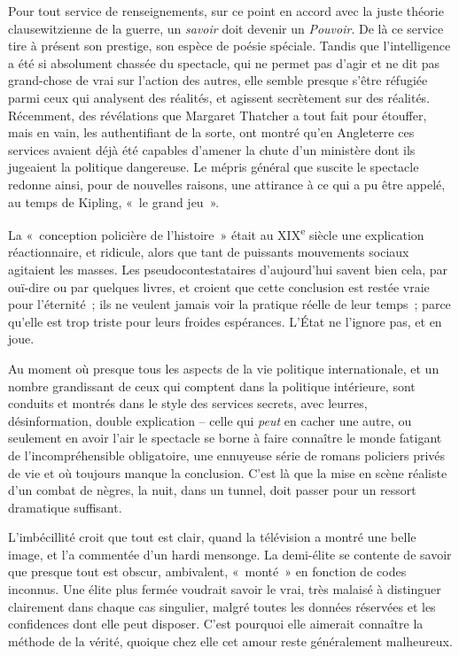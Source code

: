 \documentclass[french,twoside]{book} %
\begin{document}
\noindent Pour tout service de renseignements, sur ce point en accord avec la juste théorie clausewitzienne de la guerre, un \emph{savoir} doit devenir un \emph{Pouvoir}. De là ce service tire à présent son prestige, son espèce de poésie spéciale. Tandis que l’intelligence a été si absolument chassée du spectacle, qui ne permet pas d’agir et ne dit pas grand-chose de vrai sur l’action des autres, elle semble presque s’être réfugiée parmi ceux qui analysent des réalités, et agissent secrètement sur des réalités. Récemment, des révélations que Margaret Thatcher a tout fait pour étouffer, mais en vain, les authentifiant de la sorte, ont montré qu’en Angleterre ces services avaient déjà été capables d’amener la chute d’un ministère dont ils jugeaient la politique dangereuse. Le mépris général que suscite le spectacle redonne ainsi, pour de nouvelles raisons, une attirance à ce qui a pu être appelé, au temps de Kipling, « le grand jeu ».\par
La « conception policière de l’histoire » était au \textsc{XIX}\textsuperscript{e} siècle une explication réactionnaire, et ridicule, alors que tant de puissants mouvements sociaux agitaient les masses. Les pseudocontestataires d’aujourd’hui savent bien cela, par ouï-dire ou par quelques livres, et croient que cette conclusion est restée vraie pour l’éternité ; ils ne veulent jamais voir la pratique réelle de leur temps ; parce qu’elle est trop triste pour leurs froides espérances. L’État ne l’ignore pas, et en joue.\par
Au moment où presque tous les aspects de la vie politique internationale, et un nombre grandissant de ceux qui comptent dans la politique intérieure, sont conduits et montrés dans le style des services secrets, avec leurres, désinformation, double explication – celle qui \emph{peut} en cacher une autre, ou seulement en avoir l’air le spectacle se borne à faire connaître le monde fatigant de l’incompréhensible obligatoire, une ennuyeuse série de romans policiers privés de vie et où toujours manque la conclusion. C’est là que la mise en scène réaliste d’un combat de nègres, la nuit, dans un tunnel, doit passer pour un ressort dramatique suffisant.\par
L’imbécillité croit que tout est clair, quand la télévision a montré une belle image, et l’a commentée d’un hardi mensonge. La demi-élite se contente de savoir que presque tout est obscur, ambivalent, « monté » en fonction de codes inconnus. Une élite plus fermée voudrait savoir le vrai, très malaisé à distinguer clairement dans chaque cas singulier, malgré toutes les données réservées et les confidences dont elle peut disposer. C’est pourquoi elle aimerait connaître la méthode de la vérité, quoique chez elle cet amour reste généralement malheureux.\par
\end{document}
